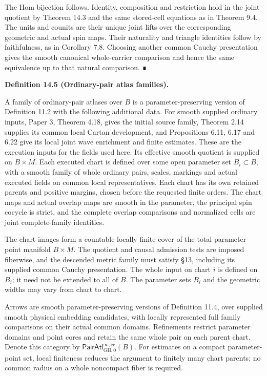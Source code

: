 \documentclass[
  english,
  11pt,
  reqno]{amsart}
\makeatletter
\newcommand{\pandocstatementheading}[1]{%
  \par\if@nobreak\else
    \addpenalty{\@beginparpenalty}%
    \addvspace{.5\baselineskip plus .2\baselineskip minus .2\baselineskip}%
  \fi
  {\normalfont\bfseries #1\par}%
  \nobreak\@afterindenttrue\@afterheading
}
\makeatother
\begin{document}
The Hom bijection follows. Identity, composition and restriction hold in
the joint quotient by Theorem 14.3 and the same stored-cell equations as
in Theorem 9.4. The units and counits are their unique joint lifts over
the corresponding geometric and actual spin maps. Their naturality and
triangle identities follow by faithfulness, as in Corollary 7.8.
Choosing another common Cauchy presentation gives the smooth canonical
whole-carrier comparison and hence the same equivalence up to that
natural comparison. ∎

\pandocstatementheading{\protect{}\label{def:ordinary-pair-atlas-families}Definition 14.5 (Ordinary-pair atlas families).}

A family of ordinary-pair atlases over \(B\) is a parameter-preserving
version of Definition 11.2 with the following additional data. For
smooth supplied ordinary inputs, Paper 3, Theorem 4.18, gives the
initial source family, Theorem 2.14 supplies its common local Cartan
development, and Propositions 6.11, 6.17 and 6.22 give its local joint
wave enrichment and finite estimates. These are the execution inputs for
the fields used here. Its effective smooth quotient is supplied on
\(B\times M\). Each executed chart is defined over some open parameter
set \(B_i\subset B\), with a smooth family of whole ordinary pairs,
scales, markings and actual executed fields on common local
representatives. Each chart has its own retained parents and positive
margins, chosen before the requested finite orders. The chart maps and
actual overlap maps are smooth in the parameter, the principal spin
cocycle is strict, and the complete overlap comparisons and normalized
cells are joint complete-family identities.

The chart images form a countable locally finite cover of the total
parameter-point manifold \(B\times M\). The quotient and causal
admission tests are imposed fiberwise, and the descended metric family
must satisfy §13, including its supplied common Cauchy presentation. The
whole input on chart \(i\) is defined on \(B_i\); it need not be
extended to all of \(B\). The parameter sets \(B_i\) and the geometric
widths may vary from chart to chart.

Arrows are smooth parameter-preserving versions of Definition 11.4, over
supplied smooth physical embedding candidates, with locally represented
full family comparisons on their actual common domains. Refinements
restrict parameter domains and point cores and retain the same whole
pair on each parent chart. Denote this category by
\(\mathsf{PairAtl}^{\infty,\mathrm{cc}}_{\mathrm{GH},0}(B)\). For
estimates on a compact parameter-point set, local finiteness reduces the
argument to finitely many chart parents; no common radius on a whole
noncompact fiber is required.
\end{document}
